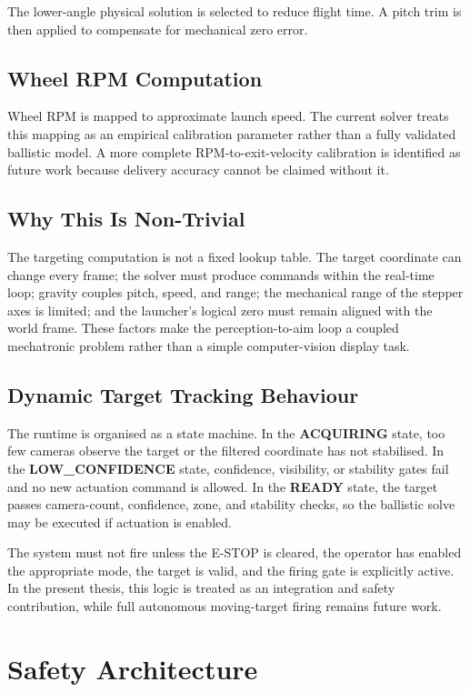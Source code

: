 The lower-angle physical solution is selected to reduce flight time. A pitch trim is then applied to compensate for mechanical zero error.

\subsection{Wheel RPM Computation}

Wheel RPM is mapped to approximate launch speed. The current solver treats this mapping as an empirical calibration parameter rather than a fully validated ballistic model. A more complete RPM-to-exit-velocity calibration is identified as future work because delivery accuracy cannot be claimed without it.

\subsection{Why This Is Non-Trivial}

The targeting computation is not a fixed lookup table. The target coordinate can change every frame; the solver must produce commands within the real-time loop; gravity couples pitch, speed, and range; the mechanical range of the stepper axes is limited; and the launcher's logical zero must remain aligned with the world frame. These factors make the perception-to-aim loop a coupled mechatronic problem rather than a simple computer-vision display task.

\subsection{Dynamic Target Tracking Behaviour}

The runtime is organised as a state machine. In the \textbf{ACQUIRING} state, too few cameras observe the target or the filtered coordinate has not stabilised. In the \textbf{LOW\_CONFIDENCE} state, confidence, visibility, or stability gates fail and no new actuation command is allowed. In the \textbf{READY} state, the target passes camera-count, confidence, zone, and stability checks, so the ballistic solve may be executed if actuation is enabled.

The system must not fire unless the E-STOP is cleared, the operator has enabled the appropriate mode, the target is valid, and the firing gate is explicitly active. In the present thesis, this logic is treated as an integration and safety contribution, while full autonomous moving-target firing remains future work.

\section{Safety Architecture}

